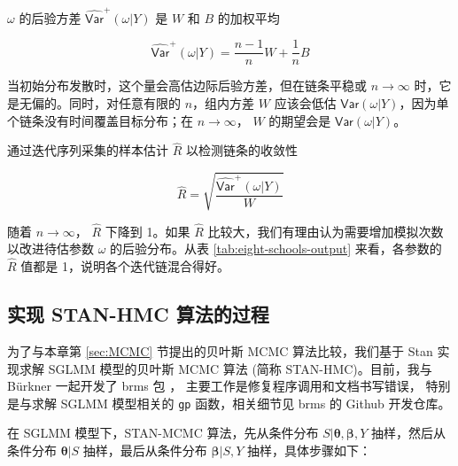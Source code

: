 \documentclass[12pt,a4paper,UTF8,twoside]{book}
\theoremstyle{definition}
\theoremstyle{definition}
\theoremstyle{definition}
\theoremstyle{remark}
\begin{document}
\noindent \(\omega\) 的后验方差 \(\widehat{\mathsf{Var}}^{+}(\omega|Y)\)
是 \(W\) 和 \(B\) 的加权平均

\begin{equation}
\widehat{\mathsf{Var}}^{+}(\omega|Y) = \frac{n-1}{n} W + \frac{1}{n} B 
\end{equation}

当初始分布发散时，这个量会高估边际后验方差，但在链条平稳或
\(n \to \infty\) 时，它是无偏的。同时，对任意有限的 \(n\)，组内方差
\(W\) 应该会低估
\(\mathsf{Var}(\omega|Y)\)，因为单个链条没有时间覆盖目标分布；在
\(n \to \infty\)， \(W\) 的期望会是 \(\mathsf{Var}(\omega|Y)\)。

通过迭代序列采集的样本估计 \(\hat{R}\) 以检测链条的收敛性

\begin{equation}
\hat{R} = \sqrt{\frac{\widehat{\mathsf{Var}}^{+}(\omega|Y)}{W}}
\end{equation}

\noindent 随着 \(n \to \infty\)， \(\hat{R}\) 下降到 1。如果 \(\hat{R}\)
比较大，我们有理由认为需要增加模拟次数以改进待估参数 \(\omega\)
的后验分布。从表 \ref{tab:eight-schools-output} 来看，各参数的
\(\hat{R}\) 值都是 1，说明各个迭代链混合得好。

\hypertarget{subsec:stan-hmc}{%
\subsection{实现 STAN-HMC 算法的过程}\label{subsec:stan-hmc}}

为了与本章第 \ref{sec:MCMC} 节提出的贝叶斯 MCMC 算法比较，我们基于 Stan
实现求解 SGLMM 模型的贝叶斯 MCMC 算法 (简称 STAN-HMC)。目前，我与
Bürkner 一起开发了 brms 包 \citep{brms2017JSS}，
主要工作是修复程序调用和文档书写错误， 特别是与求解 SGLMM 模型相关的
\texttt{gp} 函数，相关细节见 brms 的 Github 开发仓库。

在 SGLMM 模型下，STAN-MCMC 算法，先从条件分布
\(S|\boldsymbol{\theta},\boldsymbol{\beta},Y\) 抽样，然后从条件分布
\(\boldsymbol{\theta}|S\) 抽样，最后从条件分布
\(\boldsymbol{\beta}|S,Y\) 抽样，具体步骤如下：
\end{document}
